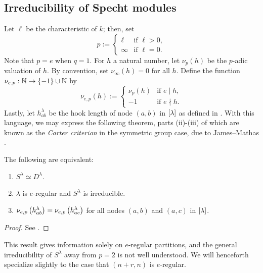 \documentclass{amsart}
\begin{document}
  \subsection{Irreducibility of Specht modules}
  Let $\ell$ be the characteristic of $k$;
  then, set
  \[
    p := \begin{cases}
      \ell & \text{if }\ell > 0,\\
      \infty & \text{if }\ell = 0.
    \end{cases}
  \]
  Note that $p = e$ when $q = 1$.
  For $h$ a natural number, let $\nu_p(h)$ be the $p$-adic valuation of $h$.
  By convention, set $\nu_\infty(h) = 0$ for all $h$.
  Define the function $\nu_{e,p} : \mathbb{N} \rightarrow \left\{ -1 \right\} \cup \mathbb{N}$ by
  \[
    \nu_{e,p}(h) := \begin{cases}
      \nu_p(h) & \text{if }e \mid h,\\
      -1 & \text{if }e \nmid h.
    \end{cases}
  \]
  Lastly, let $h_{ab}^\lambda$ be the hook length of node $(a,b)$ in $\left[ \lambda \right]$ as defined in \cite{Kleshchev}.
  With this language, we may express the following theorem, parts (ii)-(iii) of which are known as the \emph{Carter criterion} in the symmetric group case, due to James--Mathas \cite{Mathas-book}.
  \begin{theorem}\label{Mathas Irreducibility}
    The following are equivalent:
    \begin{enumerate}[label={(\roman*)}]
      \item $S^{\lambda} \simeq D^{\lambda}$.
      \item $\lambda$ is $e$-regular and $S^\lambda$ is irreducible.
      \item $\nu_{e,p}\left( h_{ab}^\lambda \right) = \nu_{e,p}\left( h_{ac}^\lambda \right)$ for all nodes $(a,b)$ and $(a,c)$ in $\left[ \lambda \right]$.
    \end{enumerate}
  \end{theorem}
  \begin{proof}
    See \cite[Thm~5.42]{Mathas-book}.
  \end{proof}
  This result gives information solely on $e$-regular partitions, and the general irreducibility of $S^\lambda$ away from $p=2$ is not well understood.
  We will henceforth specialize slightly to the case that $(n+r,n)$ is $e$-regular. 
\end{document}
